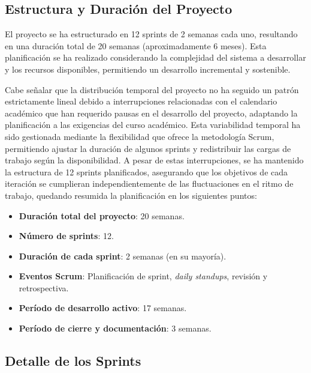 
\subsection{Estructura y Duración del Proyecto}
El proyecto se ha estructurado en 12 sprints de 2 semanas cada uno, resultando en una duración total de 20 semanas (aproximadamente 6 meses). Esta planificación se ha realizado considerando la complejidad del sistema a desarrollar y los recursos disponibles, permitiendo un desarrollo incremental y sostenible.

Cabe señalar que la distribución temporal del proyecto no ha seguido un patrón estrictamente lineal debido a interrupciones relacionadas con el calendario académico que han requerido pausas en el desarrollo del proyecto, adaptando la planificación a las exigencias del curso académico. Esta variabilidad temporal ha sido gestionada mediante la flexibilidad que ofrece la metodología Scrum, permitiendo ajustar la duración de algunos sprints y redistribuir las cargas de trabajo según la disponibilidad. A pesar de estas interrupciones, se ha mantenido la estructura de 12 sprints planificados, asegurando que los objetivos de cada iteración se cumplieran independientemente de las fluctuaciones en el ritmo de trabajo, quedando resumida la planificación en los siguientes puntos:

\begin{itemize}
\tightlist
\item
\textbf{Duración total del proyecto}: 20 semanas.
\item
\textbf{Número de sprints}: 12.
\item
\textbf{Duración de cada sprint}: 2 semanas (en su mayoría).
\item
\textbf{Eventos Scrum}: Planificación de sprint, \emph{daily standups}, revisión y retrospectiva.
\item
\textbf{Período de desarrollo activo}: 17 semanas.
\item
\textbf{Período de cierre y documentación}: 3 semanas.
\end{itemize}

\subsection{Detalle de los Sprints}


